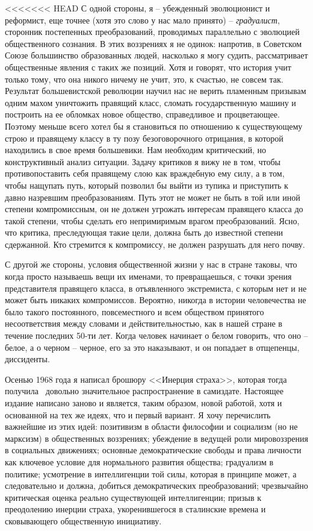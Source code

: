 \documentclass{book}
\begin{document}
<<<<<<< HEAD
С одной стороны, я -- убежденный эволюционист и реформист, еще точнее (хотя это слово у нас мало принято) -- \textit{градуалист},  сторонник постепенных преобразований, проводимых параллельно с эволюцией общественного сознания. В этих воззрениях я не одинок: напротив, в Советском Союзе большинство образованных людей, насколько я могу судить, рассматривает общественные явления с таких же позиций. Хотя и говорят, что история учит только тому, что она никого ничему не учит, это, к счастью, не совсем так. Результат большевистской революции научил нас не верить пламенным призывам одним махом уничтожить правящий класс, сломать государственную машину и построить на ее обломках новое общество, справедливое и процветающее. Поэтому меньше всего хотел бы я становиться по отношению к существующему строю и правящему классу в ту позу безоговорочного отрицания, в которой находились в свое время большевики. Нам необходим критический, но конструктивный анализ ситуации. Задачу критиков я вижу не в том, чтобы противопоставить себя правящему слою как враждебную ему силу, а в том, чтобы нащупать путь, который позволил бы выйти из тупика и приступить к давно назревшим преобразованиям. Путь этот не может не быть в той или иной степени компромиссным, он не должен угрожать интересам правящего класса до такой степени, чтобы сделать его непримиримым врагом преобразований. Ясно, что критика, преследующая такие цели, должна быть до известной степени сдержанной. Кто стремится к компромиссу, не должен разрушать для него почву.

С другой же стороны, условия общественной жизни у нас в стране таковы, что когда просто называешь вещи их именами, то превращаешься, с точки зрения представителя правящего класса, в отъявленного экстремиста, с которым нет и не может быть никаких компромиссов. Вероятно, никогда в истории человечества не было такого постоянного, повсеместного и всем обществом принятого несоответствия между словами и действительностью, как в нашей стране в течение последних 50-ти лет. Когда человек начинает о белом говорить, что оно -- белое, а о черном -- черное, его за это наказывают, и он попадает в отщепенцы, диссиденты.

Осенью 1968 года я написал брошюру <<Инерция страха>>, которая тогда получила  довольно значительное распространение в самиздате. Настоящее издание написано заново и яв­ляется, таким образом, новой работой, хотя и основанной на тех же идеях, что и первый вариант. Я хочу перечислить важнейшие из этих идей: позитивизм в области философии и социализм (но не марксизм) в общественных воззрениях; убеждение в ведущей роли мировоззрения в социальных движениях; основные демократические свободы и права личности как ключевое условие для нормального развития общества; градуализм в политике; усмотрение в интеллигенции той силы, которая в принципе может, а следовательно и должна, добиться демократических преобразований; чрезвычайно критическая оценка реально существующей интеллигенции; призыв к преодолению инерции страха, укоренившегося в сталинские времена и сковывающего общественную инициативу.
\end{document}
